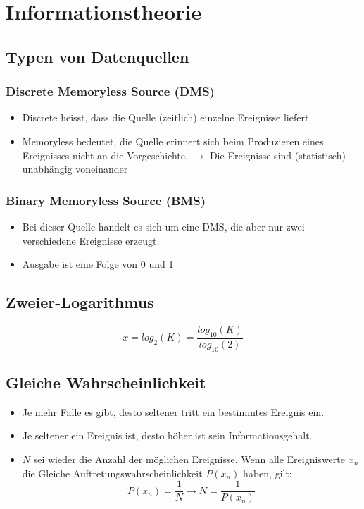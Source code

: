 \section{Informationstheorie}
\subsection{Typen von Datenquellen}
\subsubsection{Discrete Memoryless Source (DMS)}
\begin{itemize}
    \item Discrete heisst, dass die Quelle (zeitlich) einzelne Ereignisse liefert.
    \item Memoryless bedeutet, die Quelle erinnert sich beim Produzieren
    eines Ereignisses nicht an die Vorgeschichte.
    $\rightarrow$ Die Ereignisse sind (statistisch) unabhängig voneinander
\end{itemize}
\subsubsection{Binary Memoryless Source (BMS)}
\begin{itemize}
    \item Bei dieser Quelle handelt es sich um eine DMS, die aber nur zwei
    verschiedene Ereignisse erzeugt.
    \item Ausgabe ist eine Folge von 0 und 1
\end{itemize}
\subsection{Zweier-Logarithmus}
\begin{equation*}
    x = log_2(K) = \frac{log_{10}(K)}{log_{10}(2)}
\end{equation*}
\subsection{Gleiche Wahrscheinlichkeit}
\begin{itemize}
    \item Je mehr Fälle es gibt, desto seltener tritt ein bestimmtes Ereignis ein.
    \item Je seltener ein Ereignis ist, desto höher ist sein Informationsgehalt.
    \item $N$ sei wieder die Anzahl der möglichen Ereignisse. Wenn alle Ereigniswerte $x_n$ die Gleiche
    Auftretungswahrscheinlichkeit $P(x_n)$ haben, gilt:
    \begin{equation*}
        P(x_n) = \frac{1}{N} \rightarrow N = \frac{1}{P(x_n)}
    \end{equation*}
\end{itemize}
